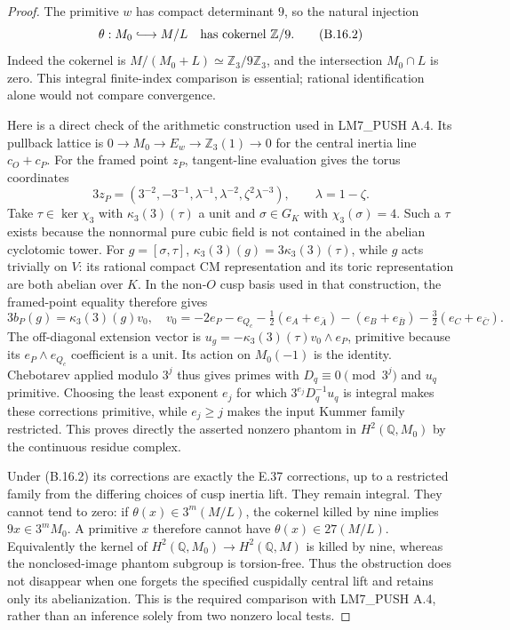 \begin{proof}
The primitive $w$ has compact determinant $9$, so the
natural injection
\[
       \theta:M_0\lhook\joinrel\longrightarrow M/L
       \quad\hbox{has cokernel }\mathbb Z/9.                     \tag{B.16.2}
\]
Indeed the cokernel is
$M/(M_0+L)\simeq\mathbb Z_3/9\mathbb Z_3$, and the
intersection $M_0\cap L$ is zero. This integral finite-index
comparison is essential; rational identification alone would
not compare convergence.

Here is a direct check of the arithmetic construction used in
LM7\_PUSH A.4. Its pullback lattice is
$0\to M_0\to E_w\to\mathbb Z_3(1)\to0$ for the central
inertia line $c_O+c_P$. For the framed point $z_P$, tangent-line
evaluation gives the torus coordinates
\[
 3z_P=(3^{-2},-3^{-1},\lambda^{-1},\lambda^{-2},
                                  \zeta^2\lambda^{-3}),
       \qquad \lambda=1-\zeta.
\]
Take $\tau\in\ker\chi_3$ with $\kappa_3(3)(\tau)$ a unit
and $\sigma\in G_K$ with $\chi_3(\sigma)=4$. Such a $\tau$
exists because the nonnormal pure cubic field is not contained
in the abelian cyclotomic tower. For $g=[\sigma,\tau]$,
$\kappa_3(3)(g)=3\kappa_3(3)(\tau)$, while $g$ acts trivially
on $V$: its rational compact CM representation and its toric
representation are both abelian over $K$. In the non-$O$ cusp
basis used in that construction, the framed-point equality
therefore gives
\[
 3b_P(g)=\kappa_3(3)(g)v_0,\quad
 v_0=-2e_P-e_{Q_c}-\tfrac12(e_A+e_{\bar A})
                -(e_B+e_{\bar B})-\tfrac32(e_C+e_{\bar C}).
\]
The off-diagonal extension vector is
$u_g=-\kappa_3(3)(\tau)v_0\wedge e_P$, primitive because its
$e_P\wedge e_{Q_c}$ coefficient is a unit. Its action on
$M_0(-1)$ is the identity. Chebotarev applied modulo $3^j$
thus gives primes with $D_q\equiv0\pmod{3^j}$ and $u_q$
primitive. Choosing the least exponent $e_j$ for which
$3^{e_j}D_q^{-1}u_q$ is integral makes these corrections
primitive, while $e_j\geq j$ makes the input Kummer family
restricted. This proves directly the asserted nonzero phantom
in $H^2(\mathbb Q,M_0)$ by the continuous residue complex.

Under (B.16.2) its corrections are exactly the E.37 corrections,
up to a restricted family from the differing choices of cusp
inertia lift. They remain integral. They cannot tend to zero:
if $\theta(x)\in3^m(M/L)$, the cokernel killed by nine implies
$9x\in3^mM_0$. A primitive $x$ therefore cannot have
$\theta(x)\in27(M/L)$. Equivalently the kernel of
$H^2(\mathbb Q,M_0)\to H^2(\mathbb Q,M)$ is killed by nine,
whereas the nonclosed-image phantom subgroup is torsion-free.
Thus the obstruction does not disappear when one forgets the
specified cuspidally central lift and retains only its
abelianization. This is the required comparison with LM7\_PUSH
A.4, rather than an inference solely from two nonzero local tests.


\end{proof}
